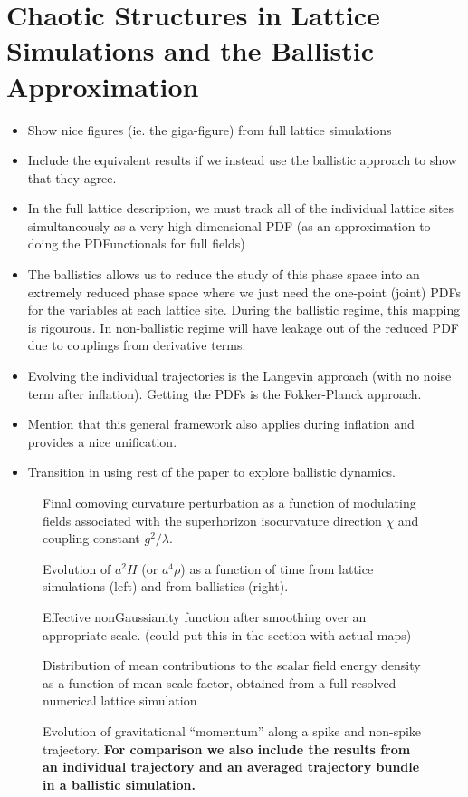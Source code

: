 \section{Chaotic Structures in Lattice Simulations and the Ballistic Approximation}

\begin{itemize}
\item Show nice figures (ie. the giga-figure) from full lattice simulations
\item Include the equivalent results if we instead use the ballistic approach to show that they agree.
\item In the full lattice description, we must track all of the individual lattice sites simultaneously as a very high-dimensional PDF (as an approximation to doing the PDFunctionals for full fields)
\item The ballistics allows us to reduce the study of this phase space into an extremely reduced phase space where we just need the one-point (joint) PDFs for the variables at each lattice site.  During the ballistic regime, this mapping is rigourous.  In non-ballistic regime will have leakage out of the reduced PDF due to couplings from derivative terms.
\item Evolving the individual trajectories is the Langevin approach (with no noise term after inflation).  Getting the PDFs is the Fokker-Planck approach.
\item Mention that this general framework also applies during inflation and provides a nice unification.
\item Transition in using rest of the paper to explore ballistic dynamics.
\end{itemize}

\begin{figure}
  \caption{Final comoving curvature perturbation as a function of modulating fields associated with the superhorizon isocurvature direction $\chi$ and coupling constant $g^2/\lambda$.}
\end{figure}

\begin{figure}
  \caption{Evolution of $a^2H$ (or $a^4\rho$) as a function of time from lattice simulations (left) and from ballistics (right).}
\end{figure}

\begin{figure}
  \caption{Effective nonGaussianity function after smoothing over an appropriate scale. (could put this in the section with actual maps)}
\end{figure}

\begin{figure}
  \caption{Distribution of mean contributions to the scalar field energy density as a function of mean scale factor, obtained from a full resolved numerical lattice simulation}
\end{figure}

\begin{figure}
  \caption{Evolution of gravitational ``momentum'' along a spike and non-spike trajectory.  {\bf For comparison we also include the results from an individual trajectory and an averaged trajectory bundle in a ballistic simulation.}}
\end{figure}
